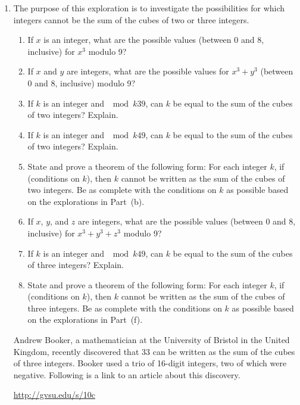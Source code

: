 \begin{enumerate}
  \item The purpose of this exploration is to investigate the possibilities for which integers cannot be the sum of the cubes of two or three integers.
\begin{enumerate}
\item If $x$ is an integer, what are the possible values (between 0 and 8, inclusive) for $x^3$ modulo 9?
\item If $x$ and $y$ are integers, what are the possible values for $x^3 + y^3$ (between 0 and 8, inclusive) modulo 9?
\item If $k$ is an integer and $\mod{k}{3}{9}$, can $k$ be equal to the sum of the cubes of two integers?  Explain.
\item If $k$ is an integer and $\mod{k}{4}{9}$, can $k$ be equal to the sum of the cubes of two integers?  Explain.
\item State and prove a theorem of the following form:  For each integer $k$, if (conditions on $k$), then $k$ cannot be written as the sum of the cubes of two integers.  Be as complete with the conditions on $k$ as possible based on the explorations in Part~(b).
\item If $x$, $y$, and $z$ are integers, what are the possible values (between 0 and 8, inclusive) for $x^3 + y^3 + z^3$ modulo 9?
\item If $k$ is an integer and $\mod{k}{4}{9}$, can $k$ be equal to the sum of the cubes of three integers?  Explain.
\item State and prove a theorem of the following form:  For each integer $k$, if (conditions on $k$), then $k$ cannot be written as the sum of the cubes of three integers.  Be as complete with the conditions on $k$ as possible based on the explorations in Part~(f).
\end{enumerate}
\note Andrew Booker, a mathematician at the University of Bristol in the United Kingdom, recently discovered that 33 can be written as the sum of the cubes of three integers.  Booker used a trio of 16-digit integers, two of which were negative.  Following is a link to an article about this discovery.

\begin{center}
\url{http://gvsu.edu/s/10c}
\end{center}
\end{enumerate}


\hbreak


\endinput


